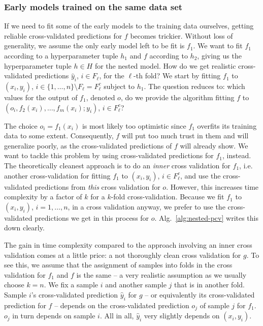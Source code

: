 \subsubsection{Early models trained on the same data set}
If we need to fit some of the early models to the training data ourselves, getting reliable 
cross-validated predictions
for $f$ becomes trickier. Without loss of generality, we assume the only early model left to be fit 
is $f_1$. We want to fit $f_1$ according to a hyperparameter tuple $h_1$ and $f$ according to $h_2$, 
giving us the hyperparameter tuple $h \in H$ for the nested model. How do 
we get realistic cross-validated predictions $\hat{y}_i$, $i \in F_\ell$, for the $\ell$-th fold? 
We start by fitting $f_1$ to $(x_i, y_i)$, $i \in \{ 1, \ldots, n \} \setminus F_\ell = F_\ell^c$ 
subject to $h_1$.
The question reduces to: which values for the output of $f_1$, denoted $o$, do we provide the 
algorithm fitting $f$ to $(o_i, f_2(x_i), \dots, f_m(x_i); y_i)$, $i \in F_\ell^c$?

The choice $o_i = f_1(x_i)$ is most likely too optimistic since $f_1$ overfits its training 
data to some extent. Consequently, $f$ will put too much trust in them and will generalize poorly, 
as the cross-validated predictions of $f$ will already show. We want to tackle this problem by 
using cross-validated predictions for $f_1$, instead. The theoretically cleanest approach 
is to do an \textit{inner} cross validation for $f_1$, i.e. another cross-validation for fitting 
$f_1$ to $(x_i, y_i)$, $i \in F_\ell^c$, and use the cross-validated predictions from \textit{this} 
cross validation for $o$. However, this increases time complexity by a factor of $k$ for a $k$-fold 
cross-validation. Because we fit $f_1$ to $(x_i, y_i)$, $i = 1, \ldots, n$, in a cross validation 
anyway, we prefer to use the cross-validated predictions we get in this process for $o$. 
Alg.\ \ref{alg:nested-pcv} writes this down clearly.



The gain in time complexity compared to the approach involving an inner cross validation comes at a 
little price: a not thoroughly clean cross validation for $g$. To see this, we assume that the 
assignment of samples into folds in the cross validation for $f_1$ and $f$ is the same -- a very 
realistic assumption as we 
usually choose $k = n$. We fix a sample $i$ and another sample $j$ that is in another fold. 
Sample $i$'s cross-validated prediction $\hat{y}_i$ for $g$ -- or equivalently its cross-validated 
prediction for $f$ -- depends on the cross-validated 
prediction $o_j$ of sample $j$ for $f_1$. $o_j$ in turn depends on sample 
$i$. All in all, $\hat{y}_i$ very slightly depends on $(x_i, y_i)$.

